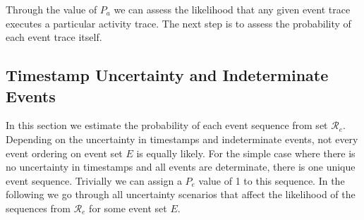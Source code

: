Through the value of $P_a$ we can assess the likelihood that any given event trace executes a particular activity trace.
The next step is to assess the probability of each event trace itself.


\subsection{Timestamp Uncertainty and Indeterminate Events}

In this section we estimate the probability of each event sequence from set $\mathcal{R}_e$.
Depending on the uncertainty in timestamps and indeterminate events, not every event ordering on event set $E$ is equally likely.
For the simple case where there is no uncertainty in timestamps and all events are determinate, there is one unique event sequence.
Trivially we can assign a $P_e$ value of 1 to this sequence.
In the following we go through all uncertainty scenarios that affect the likelihood of the sequences from $\mathcal{R}_e$ for some event set $E$.

